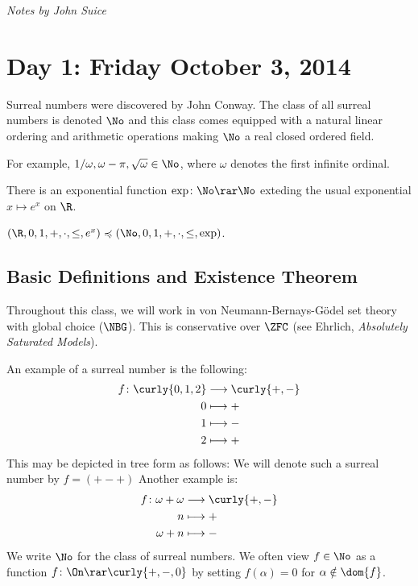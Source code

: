 \textit{Notes by John Suice}

\section*{Day 1: Friday October 3, 2014}
Surreal numbers were discovered by John Conway. 
The class of all surreal numbers is denoted $\No$ and 
this class comes equipped with a natural linear ordering and 
arithmetic operations making $\No$ a real closed ordered field. 

For example, $1/ \omega, \omega - \pi, \sqrt{\omega} \in \No$, 
where $\omega$ denotes the first infinite ordinal. 

\begin{theorem}[Kruskal, 1980s]
	There is an exponential function $\exp \colon \No \rar \No$
	exteding the usual exponential $x \mapsto e^x$ on $\R$. 
	\label{}
\end{theorem}

\begin{theorem}
	$(\R, 0, 1, +, \cdot, \leq, e^x) \preccurlyeq 
	(\No, 0, 1, +, \cdot, \leq, \exp)$. 	
	\label{}
\end{theorem}

\subsection*{Basic Definitions and Existence Theorem}
Throughout this class, we will work in von Neumann-Bernays-G\"odel 
set theory with global choice ($\NBG$). This is conservative over 
$\ZFC$ (see Ehrlich, \emph{Absolutely Saturated Models}). 

An example of a surreal number is the following: 
\begin{align*}
	f \colon \curly{0, 1, 2} &\longrightarrow \curly{+, -} \\
	0 &\longmapsto + \\
	1 &\longmapsto - \\
	2 &\longmapsto +
\end{align*}
This may be depicted in tree form as follows:
We will denote such a surreal number by $f=(+-+)$
Another example is: 
\begin{align*}
	f \colon \omega + \omega &\longrightarrow \curly{+, -} \\
	n &\longmapsto + \\
	\omega + n &\longmapsto -
\end{align*}
We write $\No$ for the class of surreal numbers. We often view 
$f \in \No$ as a function $f \colon \On \rar \curly{+, -, 0}$ by 
setting $f(\alpha) = 0$ for $\alpha \notin \dom{f}$. 

